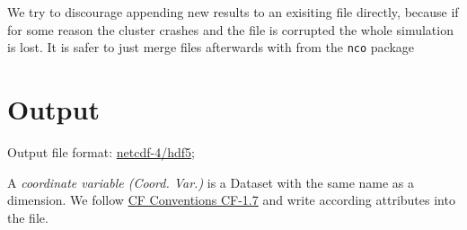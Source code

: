 \begin{tcolorbox}[title=Note]
We try to discourage
appending new results to an exisiting file directly, because if for some reason
the cluster crashes and the file is corrupted the whole simulation is lost.
It is safer to just merge files afterwards with
from the \texttt{nco} package
\end{tcolorbox}

\section{Output} \label{sec:output_file}
Output file format: \href{https://www.unidata.ucar.edu/software/netcdf/docs/}{netcdf-4/hdf5};

A \textit{coordinate variable (Coord. Var.)} is a Dataset with the same name as a dimension.
We follow
\href{http://cfconventions.org/Data/cf-conventions/cf-conventions-1.7/cf-conventions.html}{CF Conventions CF-1.7}
and write according attributes into the file.

